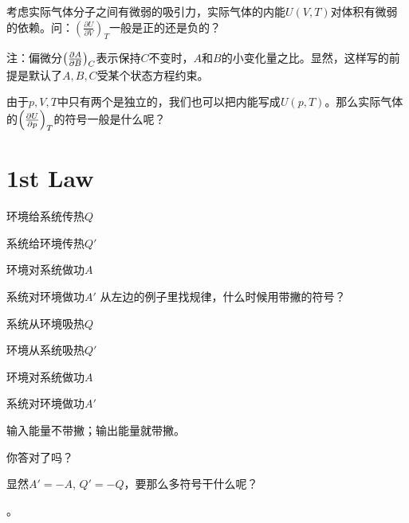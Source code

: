 \documentclass[CJK]{beamer}
\begin{document}
\begin{frame}
\bch
{}

考虑实际气体分子之间有微弱的吸引力，实际气体的内能$U(V,T)$对体积有微弱的依赖。问：$\left(\frac{\partial U}{\partial V}\right)_T$一般是正的还是负的？

\skiplines

注：偏微分$\left(\frac{\partial A}{\partial B}\right)_{C}$表示保持$C$不变时，$A$和$B$的小变化量之比。显然，这样写的前提是默认了$A,B,C$受某个状态方程约束。
\ech
\end{frame}


\begin{frame}
\bch
{}

由于$p, V, T$中只有两个是独立的，我们也可以把内能写成$U(p, T)$。那么实际气体的$\left(\frac{\partial U}{\partial p}\right)_{T}$的符号一般是什么呢？

\ech
\end{frame}


\section{1st Law}

\begin{frame}
\bch

\bitem
\item{环境给系统传热$Q$}
\item{系统给环境传热$Q'$}
\item{环境对系统做功$A$}
\item{系统对环境做功$A'$}
\eitem
\emini
{}
从左边的例子里找规律，什么时候用带撇的符号？
\emini
\ech
\end{frame}

\begin{frame}
\bch

\bitem
\item{系统从环境吸热$Q$}
\item{环境从系统吸热$Q'$}
\item{环境对系统做功$A$}
\item{系统对环境做功$A'$}
\eitem
\emini
{}

输入能量不带撇；输出能量就带撇。

\huaixiao 你答对了吗？


\emini
\ech
\end{frame}

\begin{frame}
\bch

显然$A'=-A$, $Q'=-Q$，要那么多符号干什么呢？

\skiplines

。

\ech
\end{frame}
\end{document}
